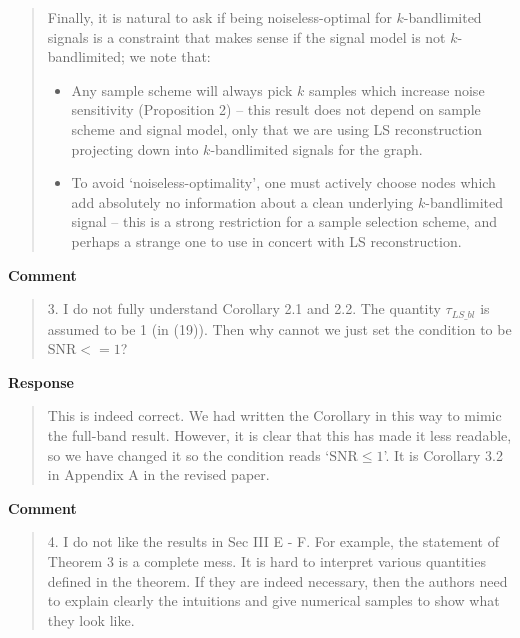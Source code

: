 \documentclass[11pt,onecolumn,journal]{IEEEtran}
\theoremstyle{definition}
\begin{document}
\begin{quote}
Finally, it is natural to ask if being noiseless-optimal for $k$-bandlimited signals is a constraint that makes sense if the signal model is not $k$-bandlimited; we note that:
\begin{itemize}
    \item Any sample scheme will always pick $k$ samples which increase noise sensitivity (Proposition 2) -- this result does not depend on sample scheme and signal model, only that we are using LS reconstruction projecting down into $k$-bandlimited signals for the graph.
    \item To avoid `noiseless-optimality', one must actively choose nodes which add absolutely no information about a clean underlying $k$-bandlimited signal -- this is a strong restriction for a sample selection scheme, and perhaps a strange one to use in concert with LS reconstruction.
\end{itemize}
\end{quote}


\textbf{Comment}
\begin{quote}
3. I do not fully understand Corollary 2.1 and 2.2. The quantity $\tau_{LS\_bl}$ is assumed to be 1 (in (19)). Then why cannot we just set the condition to be $\text{SNR}<=1$?
\end{quote}

\textbf{Response}
\begin{quote}
This is indeed correct. We had written the Corollary in this way to mimic the full-band result. However, it is clear that this has made it less readable, so we have changed it so the condition reads `$\text{SNR} \leq 1$'. It is Corollary 3.2 in Appendix A in the revised paper.
\end{quote}

\textbf{Comment}
\begin{quote}
4. I do not like the results in Sec III E - F. For example, the statement of Theorem 3 is a complete mess. It is hard to interpret various quantities defined in the theorem. If they are indeed necessary, then the authors need to explain clearly the intuitions and give numerical samples to show what they look like.
\end{quote}
\end{document}
